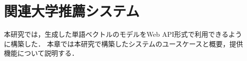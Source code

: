 \chapter{関連大学推薦システム}
本研究では，生成した単語ベクトルのモデルをWeb API形式で利用できるように構築した．
本章では本研究で構築したシステムのユースケースと概要，提供機能について説明する．



